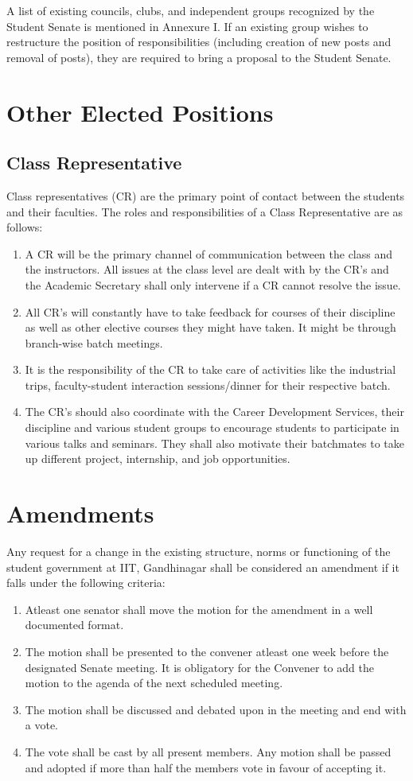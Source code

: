 \documentclass[12pt]{article}
\begin{document}
\noindent A list of existing councils, clubs, and independent groups recognized by the Student Senate is mentioned in Annexure I. If an existing group wishes to restructure the position of responsibilities (including creation of new posts and removal of posts), they are required to bring a proposal to the Student Senate. 

\section{Other Elected Positions}
\subsection{Class Representative}
Class representatives (CR) are the primary point of contact between the students and their faculties. The roles and responsibilities of a Class Representative are as follows:
\begin{enumerate}
    \item A CR will be the primary channel of communication between the class and the instructors. All issues at the class level are dealt with by the CR's and the Academic Secretary shall only intervene if a CR cannot resolve the issue.
    \item All CR's will constantly have to take feedback for courses of their discipline as well as other elective courses they might have taken. It might be through branch-wise batch meetings.
    \item It is the responsibility of the CR to take care of activities like the industrial trips, faculty-student interaction sessions/dinner for their respective batch.
    \item The CR's should also coordinate with the Career Development Services, their discipline and various student groups to encourage students to participate in various talks and seminars. They shall also motivate their batchmates to take up different project, internship, and job opportunities. 
\end{enumerate}


\section{Amendments}
Any request for a change in the existing structure, norms or functioning of the student government at IIT, Gandhinagar shall be considered an amendment if it falls under the following criteria:
\begin{enumerate}
    \item Atleast one senator shall move the motion for the amendment in a well documented format.
    \item The motion shall be presented to the convener atleast one week before the designated Senate meeting. It is obligatory for the Convener to add the motion to the agenda of the next scheduled meeting.
    \item The motion shall be discussed and debated upon in the meeting and end with a vote.
    \item The vote shall be cast by all present members. Any motion shall be passed and adopted if more than half the members vote in favour of accepting it.
\end{enumerate}
\end{document}

